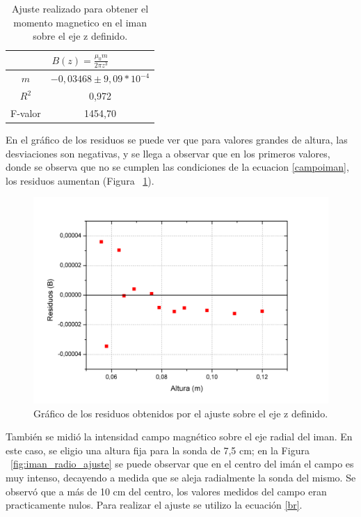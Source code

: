 \documentclass[12pt]{article}
\begin{document}
\begin{table}[H]
\centering
\caption{Ajuste realizado para obtener el momento magnetico en el iman sobre el eje z definido.}
\label{tab:iman_altura_datos}
\begin{tabular}{|c|c|}
\hline
\multicolumn{2}{|c|}{$B(z) = \frac{\mu_{0} m}{2\pi z^{3}}$} \\ \hline
$m$                      & $-0,03468\pm9,09*10^{-4}$                   \\ \hline
$R^2$                       & 0,972                              \\ \hline
F-valor                     & 1454,70                             \\ \hline
\end{tabular}
\end{table}

En el gr\'afico de los residuos se puede ver que para valores grandes de altura, las desviaciones son negativas, y se llega a observar que en los primeros valores, donde se observa que no se cumplen las condiciones de la ecuacion \ref{campoiman}, los residuos aumentan (Figura ~\ref{fig:residuos_iman_altura}).

\begin{figure}[H]
\includegraphics[width=\linewidth]{residuos_iman_altura.jpg}
\caption{Gr\'afico de los residuos obtenidos por el ajuste sobre el eje z definido.}
\label{fig:residuos_iman_altura}
\end{figure}

Tambi\'en se midi\'o la intensidad campo magn\'etico sobre el eje radial del iman. En este caso, se eligio una altura fija para la sonda de 7,5 cm; en la Figura ~\ref{fig:iman_radio_ajuste} se puede observar que en el centro del imán el campo es muy intenso, decayendo a medida que se aleja radialmente la sonda del mismo. Se observó que a más de 10 cm del centro, los valores medidos del campo eran practicamente nulos. Para realizar el ajuste se utilizo la ecuación \ref{br}.
\end{document}
